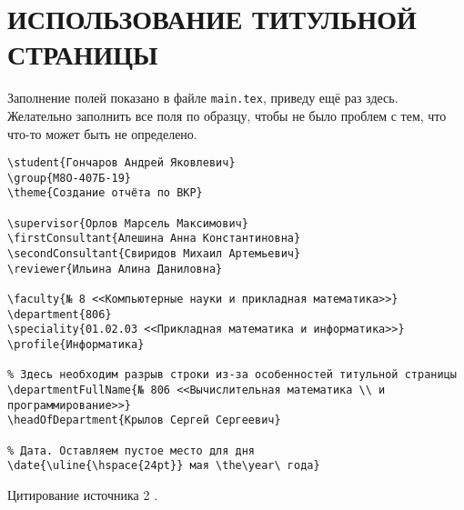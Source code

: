 \section{ИСПОЛЬЗОВАНИЕ ТИТУЛЬНОЙ СТРАНИЦЫ}

Заполнение полей показано в файле \texttt{main.tex}, приведу ещё раз здесь. 
Желательно заполнить все поля по образцу, чтобы не было проблем с тем, 
что что-то может быть не определено.

\begingroup
\fontsize{10pt}{12pt}\selectfont
\begin{verbatim}
\student{Гончаров Андрей Яковлевич}
\group{М8О-407Б-19}
\theme{Создание отчёта по ВКР}

\supervisor{Орлов Марсель Максимович}
\firstConsultant{Алешина Анна Константиновна}
\secondConsultant{Свиридов Михаил Артемьевич}
\reviewer{Ильина Алина Даниловна}

\faculty{№ 8 <<Компьютерные науки и прикладная математика>>}
\department{806}
\speciality{01.02.03 <<Прикладная математика и информатика>>}
\profile{Информатика}

% Здесь необходим разрыв строки из-за особенностей титульной страницы
\departmentFullName{№ 806 <<Вычислительная математика \\ и программирование>>}
\headOfDepartment{Крылов Сергей Сергеевич}

% Дата. Оставляем пустое место для дня
\date{\uline{\hspace{24pt}} мая \the\year\ года}
\end{verbatim}
\endgroup

\lipsum[3]

Цитирование источника 2 \cite{Wikipedia2}.